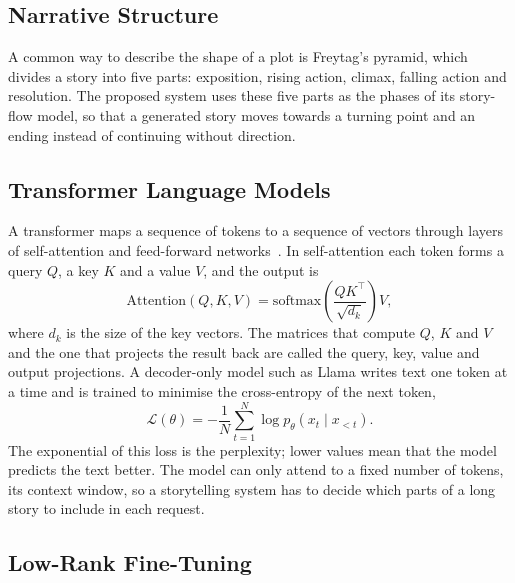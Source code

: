 \subsection{Narrative Structure}

A common way to describe the shape of a plot is Freytag's pyramid, which divides a story into five parts: exposition, rising action, climax, falling action and resolution. The proposed system uses these five parts as the phases of its story-flow model, so that a generated story moves towards a turning point and an ending instead of continuing without direction.

\subsection{Transformer Language Models}

A transformer maps a sequence of tokens to a sequence of vectors through layers of self-attention and feed-forward networks~\cite{vaswani2017attention}. In self-attention each token forms a query $Q$, a key $K$ and a value $V$, and the output is
\begin{equation}
\mathrm{Attention}(Q,K,V) = \mathrm{softmax}\!\left(\frac{QK^{\top}}{\sqrt{d_k}}\right)V ,
\label{eq:attention}
\end{equation}
where $d_k$ is the size of the key vectors. The matrices that compute $Q$, $K$ and $V$ and the one that projects the result back are called the query, key, value and output projections. A decoder-only model such as Llama writes text one token at a time and is trained to minimise the cross-entropy of the next token,
\begin{equation}
\mathcal{L}(\theta) = -\frac{1}{N}\sum_{t=1}^{N} \log p_{\theta}\left(x_t \mid x_{<t}\right).
\label{eq:ce}
\end{equation}
The exponential of this loss is the perplexity; lower values mean that the model predicts the text better. The model can only attend to a fixed number of tokens, its context window, so a storytelling system has to decide which parts of a long story to include in each request.

\subsection{Low-Rank Fine-Tuning}

